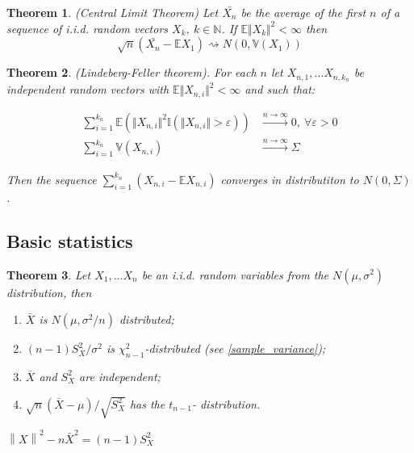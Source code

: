 \documentclass[12pt]{article}
\newtheorem{theorem}{Theorem}[section]
\theoremstyle{definition}
\theoremstyle{remark}
\numberwithin{equation}{section}
\newcommand{\NN}{\mathbb{N}}
\newcommand{\EE}{\mathbb{E}}
\newcommand{\VV}{\mathbb{V}}
\newcommand{\II}{\mathbb{I}}
\begin{document}
\begin{theorem}\label{clt}\emph{(Central Limit Theorem)} Let $\bar{X_n}$ be the average of the first $n$ of a sequence of i.i.d. random vectors $X_k,\ k\in\NN$. If $\EE \Vert X_k\Vert^2<\infty$ then
	\begin{equation}\label{clt_eq}
		\sqrt{n}(\bar{X_n} - \EE X_1) \rightsquigarrow N\left(0, \VV (X_1)\right)
	\end{equation}
\end{theorem}

\begin{theorem}\label{lf_clt}\emph{(Lindeberg-Feller theorem)}. For each $n$ let $X_{n,1},\ldots X_{n, k_n}$ be independent random vectors with $\EE \Vert X_{n,i}\Vert^2<\infty$ and such that:

	\begin{align*}
		\sum_{i=1}^{k_n}\EE\left(\Vert X_{n,i}\Vert^2\II\left(\Vert X_{n,i}\Vert>\varepsilon \right)\right) &\xrightarrow[]{n\rightarrow\infty} 0, \ \forall \varepsilon > 0\\
		\sum_{i=1}^{k_n} \VV(X_{n,i}) &\xrightarrow[]{n\rightarrow\infty} \Sigma
	\end{align*}

\noindent Then the sequence $\sum_{i = 1}^{k_n}\left(X_{n,i} - \EE X_{n,i} \right)$ converges in distributiton to $N(0, \Sigma)$.
\end{theorem}

\subsection{Basic statistics}

\begin{theorem}\label{normaliid}
	Let $X_1,\ldots X_n$ be an i.i.d. random variables from the $N(\mu, \sigma^2)$ distribution, then
	\begin{enumerate}
		\item $\bar X$ is $N(\mu, \sigma^2/n)$ distributed;
		\item $(n-1)S_X^2/\sigma^2$ is $\chi^2_{n-1}$-distributed (see \ref{sample_variance});
		\item $\bar X$ and $S^2_{X}$ are independent;
		\item $\sqrt{n}(\bar{X} - \mu)/\sqrt{S_X^2}$ has the $t_{n-1}$- distribution.
	\end{enumerate}
\end{theorem}
\proof $\left\|X\right\|^2 - n \bar{X}^2 = (n-1)S_X^2$
\end{document}
